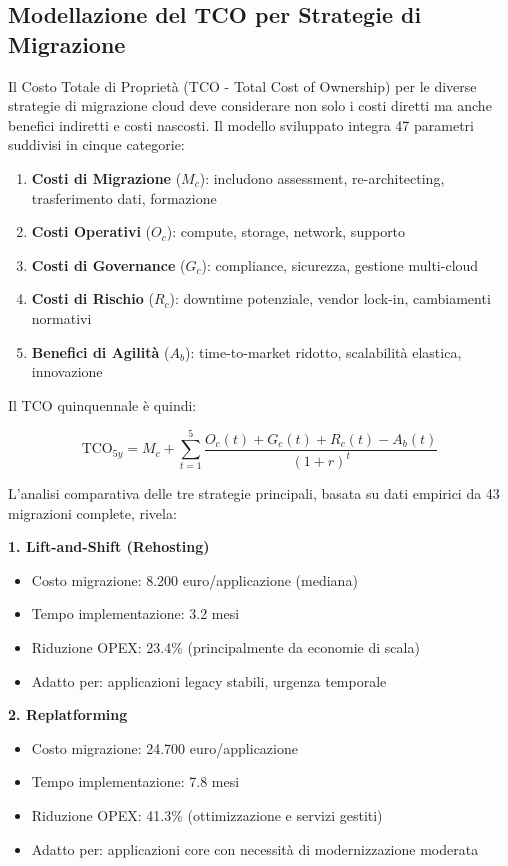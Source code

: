 \subsection{Modellazione del TCO per Strategie di Migrazione}

Il Costo Totale di Proprietà (TCO - Total Cost of Ownership) per le diverse strategie di migrazione cloud deve considerare non solo i costi diretti ma anche benefici indiretti e costi nascosti. Il modello sviluppato\autocite{KhajehHosseini2024} integra 47 parametri suddivisi in cinque categorie:

\begin{enumerate}
    \item \textbf{Costi di Migrazione} ($M_c$): includono assessment, re-architecting, trasferimento dati, formazione
    \item \textbf{Costi Operativi} ($O_c$): compute, storage, network, supporto
    \item \textbf{Costi di Governance} ($G_c$): compliance, sicurezza, gestione multi-cloud
    \item \textbf{Costi di Rischio} ($R_c$): downtime potenziale, vendor lock-in, cambiamenti normativi
    \item \textbf{Benefici di Agilità} ($A_b$): time-to-market ridotto, scalabilità elastica, innovazione
\end{enumerate}

Il TCO quinquennale è quindi:

\begin{equation}
\text{TCO}_{5y} = M_c + \sum_{t=1}^{5} \frac{O_c(t) + G_c(t) + R_c(t) - A_b(t)}{(1+r)^t}
\end{equation}

L'analisi comparativa delle tre strategie principali, basata su dati empirici da 43 migrazioni complete\autocite{McKinsey2024cloud}, rivela:

\textbf{1. Lift-and-Shift (Rehosting)}
\begin{itemize}
    \item Costo migrazione: 8.200 euro/applicazione (mediana)
    \item Tempo implementazione: 3.2 mesi
    \item Riduzione OPEX: 23.4\% (principalmente da economie di scala)
    \item Adatto per: applicazioni legacy stabili, urgenza temporale
\end{itemize}

\textbf{2. Replatforming}
\begin{itemize}
    \item Costo migrazione: 24.700 euro/applicazione
    \item Tempo implementazione: 7.8 mesi
    \item Riduzione OPEX: 41.3\% (ottimizzazione e servizi gestiti)
    \item Adatto per: applicazioni core con necessità di modernizzazione moderata
\end{itemize}

